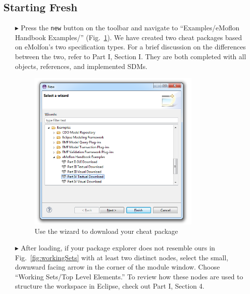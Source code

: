 \subsection{Starting Fresh}
\label{sec:loadSourceMeta}
\begin{itemize}

\item[$\blacktriangleright$] Press the \texttt{new} button on the toolbar and navigate to ``Examples/eMoflon Handbook Examples/''
(Fig.~\ref{fig:downPartIV}).  We have created two cheat packages based on eMolfon's two specification types. For a brief discussion on the differences between
the two, refer to Part I, Section I. They are both completed with all objects, references, and implemented SDMs.

\begin{figure}[htbp]
\begin{center}
  \includegraphics[width=0.8\textwidth]{eclipse_downloadWizardPartIV}
  \caption{Use the wizard to download your cheat package}
  \label{fig:downPartIV}
\end{center}
\end{figure}

\item[$\blacktriangleright$] After loading, if your package explorer does not resemble ours in Fig.~\ref{fig:workingSets} with at least two
distinct nodes, select the small, downward facing arrow in the corner of the module window. Choose ``Working Sets/Top Level Elements.'' To review how these
nodes are used to structure the workspace in Eclipse, check out Part I, Section 4.


\end{itemize}
